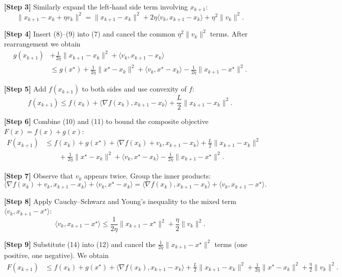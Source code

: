 \documentclass{article}
\begin{document}
\noindent\textbf{[Step 3]}  Similarly expand the left‑hand side term involving $x_{k+1}$:
\[
\|x_{k+1}-x_{k}+\eta v_{k}\|^{2}
=\|x_{k+1}-x_{k}\|^{2}+2\eta\langle v_{k},x_{k+1}-x_{k}\rangle+\eta^{2}\|v_{k}\|^{2}. 
\tag{9}
\]

\noindent\textbf{[Step 4]}  Insert (8)–(9) into (7) and cancel the common $\eta^{2}\|v_{k}\|^{2}$ terms. After rearrangement we obtain
\[
\begin{aligned}
g(x_{k+1}) &+ \frac{1}{2\eta}\|x_{k+1}-x_{k}\|^{2}
+ \langle v_{k},x_{k+1}-x_{k}\rangle  \\
& \le g(x^{\star})+ \frac{1}{2\eta}\|x^{\star}-x_{k}\|^{2}
+ \langle v_{k},x^{\star}-x_{k}\rangle
-\frac{1}{2\eta}\|x_{k+1}-x^{\star}\|^{2}. \tag{10}
\end{aligned}
\]

\noindent\textbf{[Step 5]}  Add $f(x_{k+1})$ to both sides and use convexity of $f$:
\[
f(x_{k+1}) \le f(x_{k})+\langle\nabla f(x_{k}),x_{k+1}-x_{k}\rangle
+\frac{L}{2}\|x_{k+1}-x_{k}\|^{2}. \tag{11}
\]

\noindent\textbf{[Step 6]}  Combine (10) and (11) to bound the composite objective $F(x)=f(x)+g(x)$:
\[
\begin{aligned}
F(x_{k+1}) &\le f(x_{k})+g(x^{\star})
+\langle\nabla f(x_{k})+v_{k},x_{k+1}-x_{k}\rangle
+\frac{L}{2}\|x_{k+1}-x_{k}\|^{2}\\
&\qquad +\frac{1}{2\eta}\|x^{\star}-x_{k}\|^{2}
+\langle v_{k},x^{\star}-x_{k}\rangle
-\frac{1}{2\eta}\|x_{k+1}-x^{\star}\|^{2}. \tag{12}
\end{aligned}
\]

\noindent\textbf{[Step 7]}  Observe that $v_{k}$ appears twice. Group the inner products:
\[
\langle\nabla f(x_{k})+v_{k},x_{k+1}-x_{k}\rangle
+\langle v_{k},x^{\star}-x_{k}\rangle
= \langle\nabla f(x_{k}),x_{k+1}-x_{k}\rangle
+\langle v_{k},x_{k+1}-x^{\star}\rangle. \tag{13}
\]

\noindent\textbf{[Step 8]}  Apply Cauchy–Schwarz and Young’s inequality to the mixed term
$\langle v_{k},x_{k+1}-x^{\star}\rangle$:
\[
\langle v_{k},x_{k+1}-x^{\star}\rangle
\le \frac{1}{2\eta}\|x_{k+1}-x^{\star}\|^{2}
+\frac{\eta}{2}\|v_{k}\|^{2}. \tag{14}
\]

\noindent\textbf{[Step 9]}  Substitute (14) into (12) and cancel the $\frac{1}{2\eta}\|x_{k+1}-x^{\star}\|^{2}$ terms (one positive, one negative). We obtain
\[
\begin{aligned}
F(x_{k+1}) &\le f(x_{k})+g(x^{\star})
+\langle\nabla f(x_{k}),x_{k+1}-x_{k}\rangle
+\frac{L}{2}\|x_{k+1}-x_{k}\|^{2}
+\frac{1}{2\eta}\|x^{\star}-x_{k}\|^{2}
+\frac{\eta}{2}\|v_{k}\|^{2}. \tag{15}
\end{aligned}
\]
\end{document}
